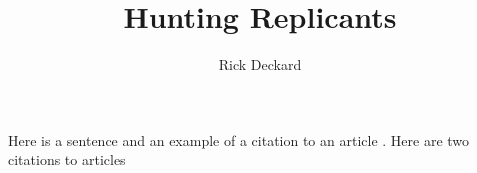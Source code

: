 \documentclass{article}
\title{Hunting Replicants}
\author{Rick Deckard}
\begin{document}
\maketitle

Here is a sentence and an example of a citation 
to an article \cite{mattar:2005aa}. Here are two 
citations to articles \cite{mattar:2005aa, mcgregor:2016aa}

 

\end{document}
